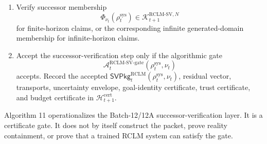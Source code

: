 \documentclass[11pt,a4paper]{article}
\newcommand{\Acal}{\mathcal A}
\newcommand{\Kcal}{\mathcal K}
\newcommand{\RCLM}{\mathrm{RCLM}}
\newcommand{\sys}{\mathrm{sys}}
\newcommand{\cert}{\mathrm{cert}}
\newcommand{\gate}{\mathrm{gate}}
\begin{document}
\begin{enumerate}[label=(\arabic*),leftmargin=1.5em]
    \item Verify successor membership
    \[
    \Phi_{\nu_t}(\rho_t^{\sys})\in\Kcal_{t+1}^{\RCLM\text{-}\mathrm{SV},N}
    \]
    for finite-horizon claims, or the corresponding infinite generated-domain membership for infinite-horizon claims.
    \item Accept the successor-verification step only if the algorithmic gate
    \[
    \Acal_t^{\RCLM\text{-}\mathrm{SV}\text{-}\gate}(\rho_t^{\sys},\nu_t)
    \]
    accepts.  Record the accepted \(\mathsf{SVPkg}_t^{\RCLM}(\rho_t^{\sys},\nu_t)\), residual vector, transports, uncertainty envelope, goal-identity certificate, trust certificate, and budget certificate in \(\mathcal H_{t+1}^{\cert}\).
\end{enumerate}
Algorithm 11 operationalizes the Batch-12/12A successor-verification layer.  It is a certificate gate.  It does not by itself construct the packet, prove reality containment, or prove that a trained RCLM system can satisfy the gate.
\end{document}
